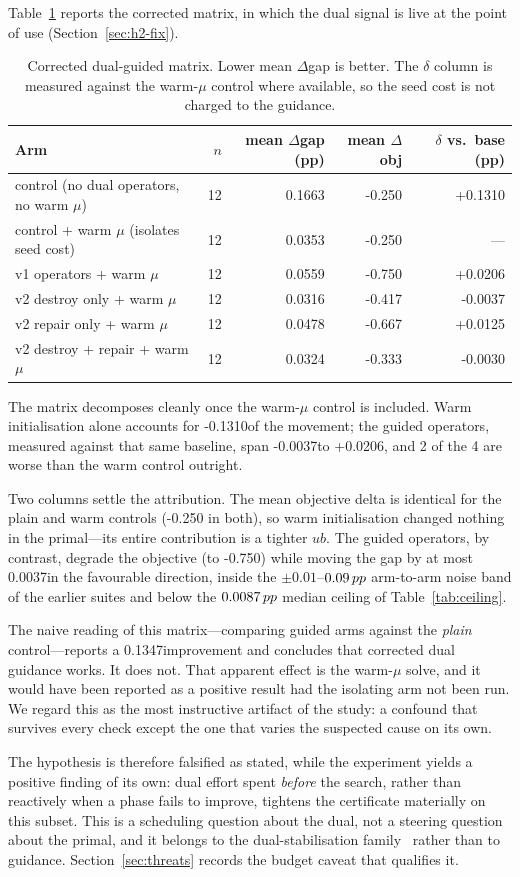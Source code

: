 Table~\ref{tab:h2fixed} reports the corrected matrix, in which the dual signal is live at the point of use (Section~\ref{sec:h2-fix}).

\begin{table}[htbp]
\centering
\caption{Corrected dual-guided matrix. Lower mean $\Delta$gap is better. The $\delta$ column is measured against the warm-$\mu$ control where available, so the seed cost is not charged to the guidance.}
\label{tab:h2fixed}
\begin{tabular}{lrrrr}
\toprule
Arm & $n$ & mean $\Delta$gap (pp) & mean $\Delta$obj & $\delta$ vs.\ base (pp) \\
\midrule
control (no dual operators, no warm $\mu$) & 12 & 0.1663 & -0.250 & +0.1310 \\
control + warm $\mu$ (isolates seed cost) & 12 & 0.0353 & -0.250 & --- \\
v1 operators + warm $\mu$ & 12 & 0.0559 & -0.750 & +0.0206 \\
v2 destroy only + warm $\mu$ & 12 & 0.0316 & -0.417 & -0.0037 \\
v2 repair only + warm $\mu$ & 12 & 0.0478 & -0.667 & +0.0125 \\
v2 destroy + repair + warm $\mu$ & 12 & 0.0324 & -0.333 & -0.0030 \\
\bottomrule
\end{tabular}
\end{table}

The matrix decomposes cleanly once the warm-$\mu$ control is included. Warm initialisation alone accounts for -0.1310\pp of the movement; the guided operators, measured against that same baseline, span -0.0037\pp to +0.0206\pp, and 2 of the 4 are worse than the warm control outright.

Two columns settle the attribution. The mean objective delta is identical for the plain and warm controls (-0.250 in both), so warm initialisation changed nothing in the primal---its entire contribution is a tighter $ub$. The guided operators, by contrast, degrade the objective (to -0.750) while moving the gap by at most 0.0037\pp in the favourable direction, inside the $\pm0.01$--$0.09\,pp$ arm-to-arm noise band of the earlier suites and below the $0.0087\,pp$ median ceiling of Table~\ref{tab:ceiling}.

The naive reading of this matrix---comparing guided arms against the \emph{plain} control---reports a 0.1347\pp improvement and concludes that corrected dual guidance works. It does not. That apparent effect is the warm-$\mu$ solve, and it would have been reported as a positive result had the isolating arm not been run. We regard this as the most instructive artifact of the study: a confound that survives every check except the one that varies the suspected cause on its own.

The hypothesis is therefore falsified as stated, while the experiment yields a positive finding of its own: dual effort spent \emph{before} the search, rather than reactively when a phase fails to improve, tightens the certificate materially on this subset. This is a scheduling question about the dual, not a steering question about the primal, and it belongs to the dual-stabilisation family~\cite{DuMerle1999Stabilized} rather than to guidance. Section~\ref{sec:threats} records the budget caveat that qualifies it.
